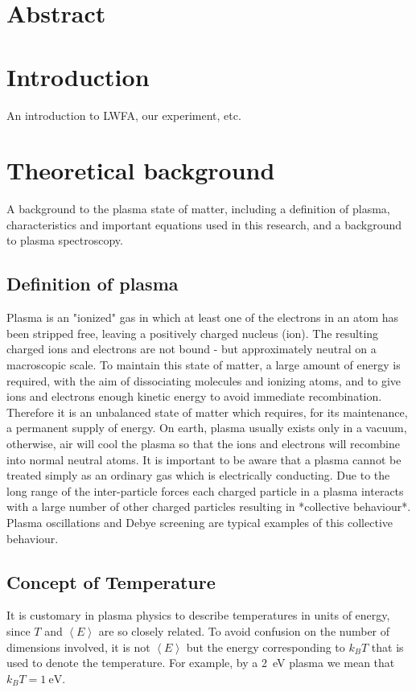 \documentclass[nofonts]{tufte-book}
\begin{document}
	\chapter{Abstract}\label{chap:abstract}
	\chapter{Introduction}\label{chap:intro}
	An introduction to LWFA, our experiment, etc.
	\chapter{Theoretical background}\label{chap:background}
	A background to the plasma state of matter, including a definition of plasma, characteristics and important equations used in this research, and a background to plasma spectroscopy.
	\section{Definition of plasma}
Plasma is an "ionized" gas in which at least one of the electrons in an atom has been stripped free, leaving a positively charged nucleus (ion). The resulting charged ions and electrons are not bound - but approximately neutral on a macroscopic scale. To maintain this state of matter, a large amount of energy is required, with the aim of dissociating molecules and ionizing atoms, and to give ions and electrons enough kinetic energy to avoid immediate recombination. Therefore it is an unbalanced state of matter which requires, for its maintenance, a permanent supply of energy. On earth, plasma usually exists only in a vacuum, otherwise, air will cool the plasma so that the ions and electrons will recombine into normal neutral atoms. It is important to be aware that a plasma cannot be treated simply as an ordinary gas which is electrically conducting. Due to the long range of the inter-particle forces each charged particle in a plasma interacts with a large number of other charged particles resulting in *collective behaviour*. Plasma oscillations and Debye screening are typical examples of this collective behaviour.
\section{Concept of Temperature}
It is customary in plasma physics to describe temperatures in units of energy, since $T$ and $\left<E\right>$ are so closely related. To avoid confusion on the number of dimensions involved, it is not $\left<E\right>$ but the energy corresponding to $k_B T$ that is used to denote the temperature. For example, by a \SI{2}{\electronvolt} plasma we mean that $k_B T = \SI{1}{\electronvolt}$.
\end{document}
